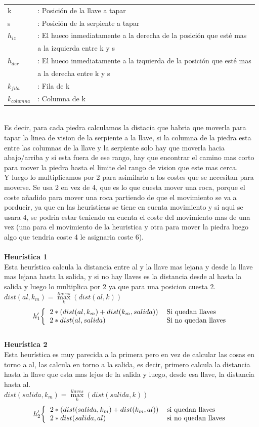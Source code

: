 \documentclass[11pt,spanish]{article}
\begin{document}
			\begin{tabular}{ll}
				k&: Posición de la llave a tapar\\
				s&: Posición de la serpiente a tapar\\
				$h_{iz}$&: El hueco inmediatamente a la derecha de la posición que esté mas \\
				&  a la izquierda entre k y s\\
				$h_{der}$&: El hueco inmediatamente a la izquierda de la posición que esté mas \\
				&  a la derecha entre k y s\\
				$k_{fila}$&: Fila de k\\
				$k_{columna}$&: Columna de k
			\end{tabular}\\
			Es decir, para cada piedra calculamos la distacia que habria que moverla para tapar la linea de vision de la serpiente a la llave, si la columna de la piedra esta entre las columnas de la llave y la serpiente solo hay que moverla hacia abajo/arriba y si esta fuera de ese rango, hay que encontrar el camino mas corto para mover la piedra hasta el limite del rango de vision que este mas cerca.\\
			Y luego lo multiplicamos por 2 para asimilarlo a los costes que se necesitan para moverse. Se usa 2 en vez de 4, que es lo que cuesta mover una roca, porque el coste añadido para mover una roca partiendo de que el movimiento se va a porducir, ya que en las heuristicas se tiene en cuenta movimiento y si aqui se usara 4, se podria estar teniendo en cuenta el coste del movimiento mas de una vez (una para el movimiento de la heuristica y otra para mover la piedra luego algo que tendria coste 4 le asignaria coste 6).\\
			\\
			\textbf{Heurística 1}\\
			Esta heurística calcula la distancia entre al y la llave mas lejana y desde la llave mas lejana hasta la salida, y si no hay llaves es la distancia desde al hasta la salida y luego lo multiplica por 2 ya que para una posicion cuesta 2.\\
			$dist(al,k_m) = \max\limits_k^{llaves}(dist(al,k))$
			\[
			h_1'
			\bigg \{
				\begin{tabular}{ll}
					$2*(dist(al,k_m) + dist(k_m,salida))$ &Si quedan llaves\\
					$2*dist(al,salida)$ &Si no quedan llaves
				\end{tabular}
			\]
			\\
			\textbf{Heurística 2}\\
			Esta heurística es muy parecida a la primera pero en vez de calcular las cosas en torno a al, las calcula en torno a la salida, es decir, primero calcula la distancia hasta la llave que esta mas lejos de la salida y luego, desde esa llave, la distancia hasta al.\\
			$dist(salida,k_m) = \max\limits_k^{llaves}(dist(salida,k))$
			\[
			h_2'
			\bigg \{
				\begin{tabular}{ll}
					$2*(dist(salida,k_m) + dist(k_m,al))$ &si quedan llaves\\
					$2*dist(salida,al)$ &si no quedan llaves
				\end{tabular}
			\]
\end{document}
